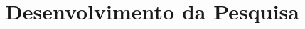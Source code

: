

\chapter{Desenvolvimento da Pesquisa}
    \label{cha:desenvolvimento-da-pesquisa}
    \markright{}
    
    
    
    